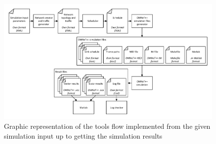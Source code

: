 \documentclass[conference]{IEEEtran}
\begin{document}








\begin{figure}[h]
	\centerline{\includegraphics[keepaspectratio=true, width=16cm] {figures/toolchain-architecture}}
	\caption{Graphic representation of the tools flow implemented from the given simulation input up to getting the simulation results}
	\label{fig:toolchain-architecture}
\end{figure}
\end{document}
